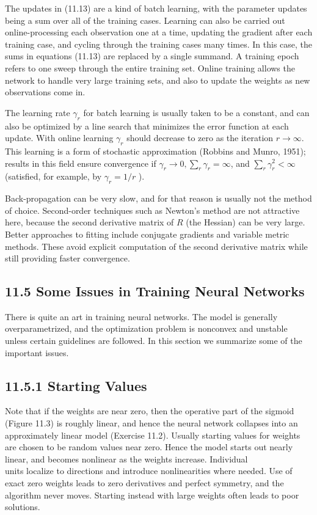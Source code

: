 \documentclass[10pt]{article}
\begin{document}
The updates in (11.13) are a kind of batch learning, with the parameter updates being a sum over all of the training cases. Learning can also be carried out online-processing each observation one at a time, updating the gradient after each training case, and cycling through the training cases many times. In this case, the sums in equations (11.13) are replaced by a single summand. A training epoch refers to one sweep through the entire training set. Online training allows the network to handle very large training sets, and also to update the weights as new observations come in.

The learning rate $\gamma_{r}$ for batch learning is usually taken to be a constant, and can also be optimized by a line search that minimizes the error function at each update. With online learning $\gamma_{r}$ should decrease to zero as the iteration $r \rightarrow \infty$. This learning is a form of stochastic approximation (Robbins and Munro, 1951); results in this field ensure convergence if $\gamma_{r} \rightarrow 0, \sum_{r} \gamma_{r}=\infty$, and $\sum_{r} \gamma_{r}^{2}<\infty$ (satisfied, for example, by $\gamma_{r}=1 / r$ ).

Back-propagation can be very slow, and for that reason is usually not the method of choice. Second-order techniques such as Newton's method are not attractive here, because the second derivative matrix of $R$ (the Hessian) can be very large. Better approaches to fitting include conjugate gradients and variable metric methods. These avoid explicit computation of the second derivative matrix while still providing faster convergence.

\subsection*{11.5 Some Issues in Training Neural Networks}
There is quite an art in training neural networks. The model is generally overparametrized, and the optimization problem is nonconvex and unstable unless certain guidelines are followed. In this section we summarize some of the important issues.

\subsection*{11.5.1 Starting Values}
Note that if the weights are near zero, then the operative part of the sigmoid (Figure 11.3) is roughly linear, and hence the neural network collapses into an approximately linear model (Exercise 11.2). Usually starting values for weights are chosen to be random values near zero. Hence the model starts out nearly linear, and becomes nonlinear as the weights increase. Individual\\
units localize to directions and introduce nonlinearities where needed. Use of exact zero weights leads to zero derivatives and perfect symmetry, and the algorithm never moves. Starting instead with large weights often leads to poor solutions.
\end{document}
